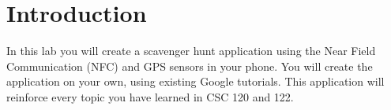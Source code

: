 \section{Introduction}
In this lab you will create a scavenger hunt application using the Near Field Communication (NFC) and GPS sensors in your phone.
You will create the application on your own, using existing Google tutorials.
This application will reinforce every topic you have learned in CSC 120 and 122.